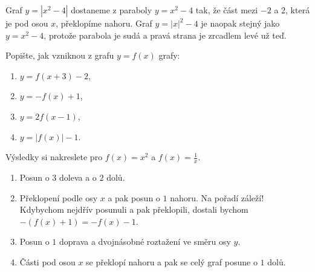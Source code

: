 \begin{example}
  Graf $y = |x^2 - 4|$ dostaneme z paraboly $y = x^2 - 4$ tak, že část mezi $-2$ a $2$, která je pod osou $x$, překlopíme nahoru. Graf $y = {|x|}^2 - 4$ je naopak stejný jako $y = x^2 - 4$, protože parabola je sudá a pravá strana je zrcadlem levé už teď.
\end{example}

\begin{center}
\end{center}

\begin{problem}
  Popište, jak vzniknou z grafu $y = f(x)$ grafy:
  \begin{enumerate}[label=(\alph*)]
    \item $y = f(x + 3) - 2$,
    \item $y = -f(x) + 1$,
    \item $y = 2f(x - 1)$,
    \item $y = |f(x)| - 1$.
  \end{enumerate}
  Výsledky si nakreslete pro $f(x) = x^2$ a $f(x) = \frac{1}{x}$.
\end{problem}

\begin{solution}
  \begin{enumerate}[label=(\alph*)]
    \item Posun o $3$ doleva a o $2$ dolů.
    \item Překlopení podle osy $x$ a pak posun o $1$ nahoru. Na pořadí záleží! Kdybychom nejdřív posunuli a pak překlopili, dostali bychom $-(f(x) + 1) = -f(x) - 1$.
    \item Posun o $1$ doprava a dvojnásobné roztažení ve směru osy $y$.
    \item Části pod osou $x$ se překlopí nahoru a pak se celý graf posune o $1$ dolů.
  \end{enumerate}
\end{solution}

